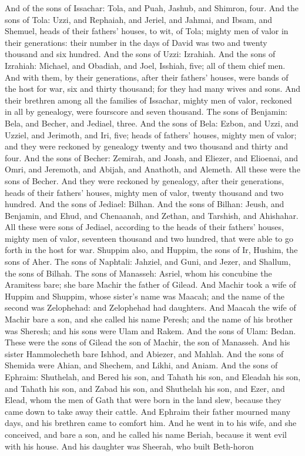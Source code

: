 And of the sons of Issachar: Tola, and Puah, Jashub, and Shimron, four. And the sons of Tola: Uzzi, and Rephaiah, and Jeriel, and Jahmai, and Ibsam, and Shemuel, heads of their fathers’ houses, to wit, of Tola; mighty men of valor in their generations: their number in the days of David was two and twenty thousand and six hundred. And the sons of Uzzi: Izrahiah. And the sons of Izrahiah: Michael, and Obadiah, and Joel, Isshiah, five; all of them chief men. And with them, by their generations, after their fathers’ houses, were bands of the host for war, six and thirty thousand; for they had many wives and sons. And their brethren among all the families of Issachar, mighty men of valor, reckoned in all by genealogy, were fourscore and seven thousand.  The sons of Benjamin: Bela, and Becher, and Jediael, three. And the sons of Bela: Ezbon, and Uzzi, and Uzziel, and Jerimoth, and Iri, five; heads of fathers’ houses, mighty men of valor; and they were reckoned by genealogy twenty and two thousand and thirty and four. And the sons of Becher: Zemirah, and Joash, and Eliezer, and Elioenai, and Omri, and Jeremoth, and Abijah, and Anathoth, and Alemeth. All these were the sons of Becher. And they were reckoned by genealogy, after their generations, heads of their fathers’ houses, mighty men of valor, twenty thousand and two hundred. And the sons of Jediael: Bilhan. And the sons of Bilhan: Jeush, and Benjamin, and Ehud, and Chenaanah, and Zethan, and Tarshish, and Ahishahar. All these were sons of Jediael, according to the heads of their fathers’ houses, mighty men of valor, seventeen thousand and two hundred, that were able to go forth in the host for war. Shuppim also, and Huppim, the sons of Ir, Hushim, the sons of Aher.  The sons of Naphtali: Jahziel, and Guni, and Jezer, and Shallum, the sons of Bilhah.  The sons of Manasseh: Asriel, whom his concubine the Aramitess bare; she bare Machir the father of Gilead. And Machir took a wife of Huppim and Shuppim, whose sister’s name was Maacah; and the name of the second was Zelophehad: and Zelophehad had daughters. And Maacah the wife of Machir bare a son, and she called his name Peresh; and the name of his brother was Sheresh; and his sons were Ulam and Rakem. And the sons of Ulam: Bedan. These were the sons of Gilead the son of Machir, the son of Manasseh. And his sister Hammolecheth bare Ishhod, and Abiezer, and Mahlah. And the sons of Shemida were Ahian, and Shechem, and Likhi, and Aniam.  And the sons of Ephraim: Shuthelah, and Bered his son, and Tahath his son, and Eleadah his son, and Tahath his son, and Zabad his son, and Shuthelah his son, and Ezer, and Elead, whom the men of Gath that were born in the land slew, because they came down to take away their cattle. And Ephraim their father mourned many days, and his brethren came to comfort him. And he went in to his wife, and she conceived, and bare a son, and he called his name Beriah, because it went evil with his house. And his daughter was Sheerah, who built Beth-horon 
